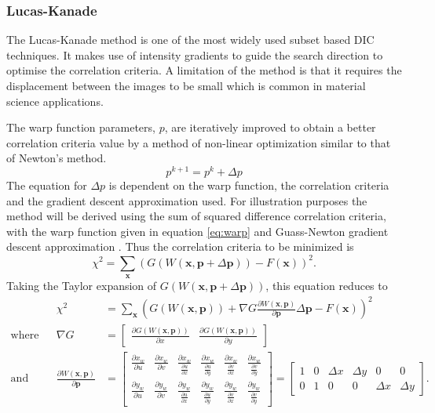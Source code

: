 \subsubsection{Lucas-Kanade}
The Lucas-Kanade method is one of the most widely used subset based DIC techniques. It makes use of intensity gradients to guide the search direction to optimise the correlation criteria. A limitation of the method is that it requires the displacement between the images to be small which is common in material science applications.

The warp function parameters, $p$, are iteratively improved to obtain a better correlation criteria value by a method of non-linear optimization similar to that of Newton's method. 
\begin{equation}
	p^{k+1} = p^k + \Delta p
\end{equation}
The equation for $\Delta p$ is dependent on the warp function, the correlation criteria and the gradient descent approximation used. For illustration purposes the method will be derived using the sum of squared difference correlation criteria, with the warp function given in equation \ref{eq:warp} and Guass-Newton gradient descent approximation \cite{lucasUnifying}. Thus the correlation criteria to be minimized is 
\begin{equation}
	\chi^2= \sum_{\bm{x}} \left( G(W(\bm{x},\bm{p} + \Delta \bm{p})) - F(\bm{x})  \right) ^2.
\end{equation}
Taking the Taylor expansion of $G(W(\bm{x},\bm{p} + \Delta \bm{p}))$, this equation reduces to
\begin{align}
	\label{eq:lucas chi}
	&& \chi^2 &= \sum_{\bm{x}} \left( G(W(\bm{x},\bm{p})) +\nabla G \frac{\partial W(\bm{x},\bm{p})}{\partial \bm{p}} \Delta \bm{p} - F(\bm{x})  \right) ^2 &\\
	\text{where}
	&&\nabla G &= 
	\begin{bmatrix}
	\frac{\partial G(W(\bm{x},\bm{p}))}{\partial x} & \frac{\partial G(W(\bm{x},\bm{p}))}{\partial y}
	\end{bmatrix} &\\
	\text{and} &&\frac{\partial W(\bm{x},\bm{p})}{\partial \bm{p}} &= 
	\begin{bmatrix}
	\frac{\partial x_w}{\partial u} & \frac{\partial x_w}{\partial v} & \frac{\partial x_w}{\frac{\partial u}{\partial x}} & \frac{\partial x_w}{\frac{\partial u}{\partial y}} & \frac{\partial x_w}{\frac{\partial v}{\partial x}} & \frac{\partial x_w}{\frac{\partial v}{\partial y}} \\
	\frac{\partial y_w}{\partial u} & \frac{\partial y_w}{\partial v} & \frac{\partial y_w}{\frac{\partial u}{\partial x}} & \frac{\partial y_w}{\frac{\partial u}{\partial y}} & \frac{\partial y_w}{\frac{\partial v}{\partial x}} & \frac{\partial y_w}{\frac{\partial v}{\partial y}}
	\end{bmatrix} =
	\begin{bmatrix}
	1 & 0 & \Delta x & \Delta y & 0 & 0\\
	0 & 1 & 0 & 0 & \Delta x & \Delta y
	\end{bmatrix}\text{.}
\end{align}
